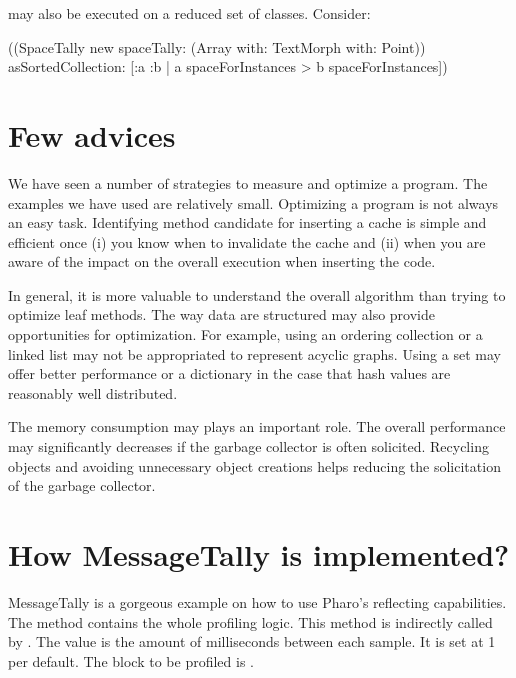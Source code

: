 \documentclass[a4paper,10pt,twoside]{book}
\begin{document}
 may also be executed on a reduced set of classes. Consider:


\begin{code}{}
((SpaceTally new spaceTally: (Array with: TextMorph with: Point)) 
	asSortedCollection: [:a :b | a spaceForInstances > b spaceForInstances]) 
\end{code}



\section{Few advices}

We have seen a number of strategies to measure and optimize a program. The examples we have used are relatively small. Optimizing a program is not always an easy task. Identifying method candidate for inserting a cache is simple and efficient once (i) you know when to invalidate the cache and (ii) when you are aware of the impact on the overall execution when inserting the code.

In general, it is more valuable to understand the overall algorithm than trying to optimize leaf methods. The way data are structured may also provide opportunities for optimization. For example, using an ordering collection or a linked list may not be appropriated to represent acyclic graphs. Using a set may offer better performance or a dictionary in the case that hash values are reasonably well distributed.

The memory consumption may plays an important role. The overall performance may significantly decreases if the garbage collector is often solicited. Recycling objects and avoiding unnecessary object creations helps reducing the solicitation of the garbage collector.

\section {How MessageTally is implemented?}

MessageTally is a gorgeous example on how to use Pharo's reflecting capabilities. The method  contains the whole profiling logic. This method is indirectly called by . The  value is the amount of milliseconds between each sample. It is set at 1 per default. The block to be profiled is .
\end{document}

